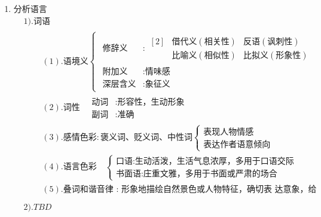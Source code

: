 \documentclass[11pt,fleqn]{article}
\begin{document}
\begin{enumerate}
\item 分析语言
  $$
  \begin{aligned}
    & 1). \mbox{词语} \\
    & \quad \begin{aligned}
      & (1). \mbox{语境义}
      \begin{cases} \begin{aligned}
          \mbox{修辞义} &: \begin{aligned}[2]
            & \mbox{借代义} ( \mbox{相关性} ) & \mbox{反语} ( \mbox{讽刺性} ) \\
            & \mbox{比喻义} ( \mbox{相似性} ) & \mbox{比拟义} ( \mbox{形象性} )
          \end{aligned} \\
          \mbox{附加义} &: \mbox{情味感} \\
          \mbox{深层含义} &: \mbox{象征义} 
        \end{aligned} \end{cases} \\
      & (2). \mbox{词性}
      \quad \begin{aligned}
        \mbox{动词} & : \mbox{形容性，生动形象} \\
        \mbox{副词} & : \mbox{准确}
      \end{aligned} \\
      & (3). \mbox{感情色彩} : \mbox{褒义词、贬义词、中性词}
      \begin{cases}
        \mbox{表现人物情感} \\
        \mbox{表达作者语意倾向}
      \end{cases} \\
      & (4). \mbox{语言色彩}
      \quad \begin{cases}
        \mbox{口语} : \mbox{生动活泼，生活气息浓厚，多用于口语交际} \\
        \mbox{书面语} : \mbox{庄重文雅，多用于书面或严肃的场合}
      \end{cases} \\
      & (5). \mbox{叠词和谐音律 : 形象地描绘自然景色或人物特征，确切表
        达意象，给人美的享受} \\
    \end{aligned} \\
    & 2). TBD
  \end{aligned}
  $$

\end{enumerate}
\end{document}
